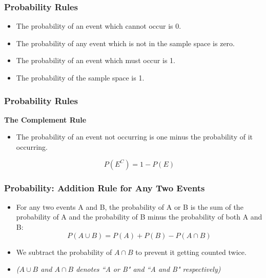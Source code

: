\documentclass{beamer}
\begin{document}
\begin{frame}
\frametitle{Probability Rules}
\begin{itemize}

\item The probability of an event which cannot occur is 0.

\item The probability of any event which is not in the sample space is zero.

\item The probability of an event which must occur is 1.

\item The probability of the sample space is 1.
\end{itemize}
\end{frame}
\begin{frame}
\frametitle{Probability Rules}
\textbf{The Complement Rule}
\begin{itemize}
\item 
The probability of an event not occurring is one minus the probability of it occurring.

   \[P(E^{C}) = 1 - P(E)\]
\end{itemize}
\end{frame}
\begin{frame}
\frametitle{Probability: Addition Rule for Any Two Events}
\Large
\vspace{-0.3cm}
\begin{itemize}
\item For any two events A and B, the probability of A or B is the sum of the probability of A and the probability of B minus the probability of both A and B:
\[P(A \cup B) = P(A) + P(B) - P(A \cap B)\]
\vspace{-0.2cm}
\item We subtract the probability of $A \cap B$ to prevent it getting counted twice.
\large
\item \textit{($A \cup B$ and $A \cap B$ denotes  ``A or B" and ``A and B" respectively) }

\end{itemize}
\end{frame}
\end{document}
